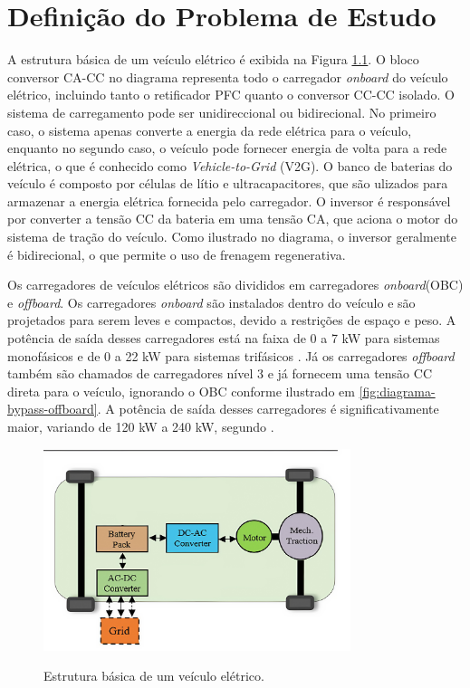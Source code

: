 \chapter{Definição do Problema de Estudo}

A estrutura básica de um veículo elétrico é exibida na Figura
\ref{fig:estrutura-veiculo-eletrico}. O bloco conversor CA-CC no diagrama representa todo o
carregador \textit{onboard} do veículo elétrico, incluindo tanto o retificador PFC quanto o
conversor CC-CC isolado. O sistema de carregamento pode ser unidireccional ou bidirecional. No
primeiro caso, o sistema apenas converte a energia da rede elétrica para o veículo, enquanto no
segundo caso, o veículo pode fornecer energia de volta para a rede elétrica, o que é conhecido
como \textit{Vehicle-to-Grid} (V2G). O banco de baterias do veículo é composto por células de
lítio e ultracapacitores, que são ulizados para armazenar a energia elétrica fornecida pelo
carregador. O inversor é responsável por converter a tensão CC da bateria em uma tensão CA, que
aciona o motor do sistema de tração do veículo. Como ilustrado no diagrama, o inversor
geralmente é bidirecional, o que permite o uso de frenagem regenerativa.

Os carregadores de veículos elétricos são divididos em carregadores \textit{onboard}(OBC) e
\textit{offboard}. Os carregadores \textit{onboard} são instalados dentro do veículo e são
projetados para serem leves e compactos, devido a restrições de espaço e peso. A potência de
saída desses carregadores está na faixa de 0 a 7 kW para sistemas monofásicos e de 0 a 22 kW
para sistemas trifásicos \cite{Yuan:2021}. Já os carregadores \textit{offboard} também são
chamados de carregadores nível 3 e já fornecem uma tensão CC direta para o veículo, ignorando o
OBC conforme ilustrado em \ref{fig:diagrama-bypass-offboard}. A potência de saída desses
carregadores é significativamente maior, variando de 120 kW a 240 kW, segundo
\cite{texas:2020}.

\begin{figure}[htb]
    \centering
    \caption{Estrutura básica de um veículo elétrico.}
    \includegraphics[width=0.8\textwidth]{Figuras/diagrama_veiculo_eletrico_edit.png}
    \label{fig:estrutura-veiculo-eletrico}
\end{figure}

